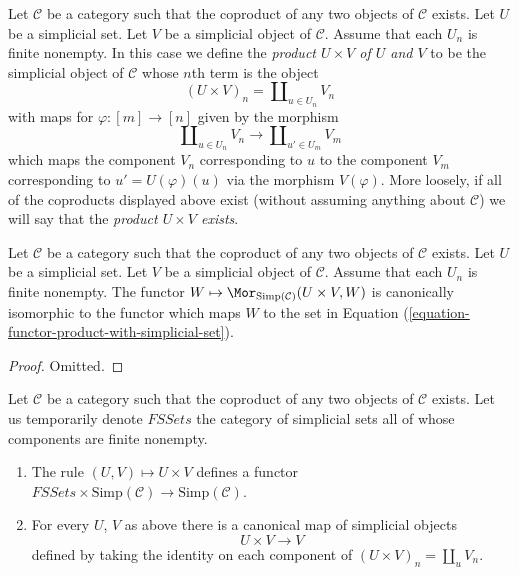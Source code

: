 \begin{definition}
\label{definition-product-with-simplicial-set}
Let $\mathcal{C}$ be a category such that the coproduct of
any two objects of $\mathcal{C}$ exists. Let
$U$ be a simplicial set. Let $V$ be a simplicial
object of $\mathcal{C}$. Assume that each $U_n$ is
finite nonempty. In this case we define
the {\it product $U \times V$ of $U$ and $V$}
to be the simplicial object of $\mathcal{C}$ whose
$n$th term is the object
$$
(U \times V)_n = \coprod\nolimits_{u\in U_n} V_n
$$
with maps for $\varphi : [m] \to [n]$ given by the
morphism
$$
\coprod\nolimits_{u\in U_n} V_n
\longrightarrow
\coprod\nolimits_{u'\in U_m} V_m
$$
which maps the component $V_n$ corresponding to $u$ to the
component $V_m$ corresponding to $u' = U(\varphi)(u)$
via the morphism $V(\varphi)$.
More loosely, if all of the coproducts displayed above
exist (without assuming anything about $\mathcal{C}$)
we will say that the {\it product $U \times V$ exists}.
\end{definition}

\begin{lemma}
\label{lemma-check-product-with-simplicial-set}
Let $\mathcal{C}$ be a category such that the coproduct of
any two objects of $\mathcal{C}$ exists. Let
$U$ be a simplicial set. Let $V$ be a simplicial
object of $\mathcal{C}$. Assume that each $U_n$ is
finite nonempty. The functor
$W \mapsto \Mor_{\text{Simp}(\mathcal{C})}(U \times V, W)$
is canonically isomorphic to the functor which
maps $W$ to the set in
Equation (\ref{equation-functor-product-with-simplicial-set}).
\end{lemma}

\begin{proof}
Omitted.
\end{proof}

\begin{lemma}
\label{lemma-back-to-U}
Let $\mathcal{C}$ be a category such that the coproduct of
any two objects of $\mathcal{C}$ exists. Let us temporarily
denote $\textit{FSSets}$ the category of simplicial sets
all of whose components are finite nonempty.
\begin{enumerate}
\item The rule $(U, V) \mapsto U \times V$
defines a functor
$\textit{FSSets} \times \text{Simp}(\mathcal{C})
\to \text{Simp}(\mathcal{C})$.
\item For every $U$, $V$ as above
there is a canonical map of simplicial objects
$$
U \times V \longrightarrow V
$$
defined by taking the identity on each component of
$(U \times V)_n = \coprod_u V_n$.
\end{enumerate}
\end{lemma}

